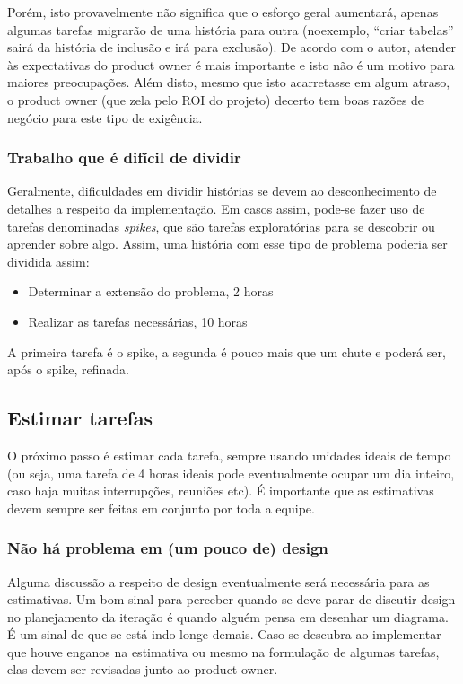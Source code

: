 \documentclass[a4paper,abntfigtabnum,noindentfirst]{abnt}
\begin{document}
Porém, isto provavelmente não significa que o esforço geral aumentará, apenas algumas tarefas migrarão de uma história para outra (noexemplo, ``criar tabelas'' sairá da história de inclusão e irá para exclusão). De acordo com o autor, atender às expectativas do product owner é mais importante e isto não é um motivo para maiores preocupações. Além disto, mesmo que isto acarretasse em algum atraso, o product owner (que zela pelo ROI do projeto) decerto tem boas razões de negócio para este tipo de exigência.


\subsubsection{Trabalho que é difícil de dividir}

Geralmente, dificuldades em dividir histórias se devem ao desconhecimento de detalhes a respeito da implementação. Em casos assim, pode-se fazer uso de tarefas denominadas \textit{spikes}, que são tarefas exploratórias para se descobrir ou aprender sobre algo. Assim, uma história com esse tipo de problema poderia ser dividida assim:
\begin{itemize}
 \item Determinar a extensão do problema, 2 horas
 \item Realizar as tarefas necessárias, 10 horas
\end{itemize}

A primeira tarefa é o spike, a segunda é pouco mais que um chute e poderá ser, após o spike, refinada.


\subsection{Estimar tarefas}

O próximo passo é estimar cada tarefa, sempre usando unidades ideais de tempo (ou seja, uma tarefa de 4 horas ideais pode eventualmente ocupar um dia inteiro, caso haja muitas interrupções, reuniões etc). É importante que as estimativas devem sempre ser feitas em conjunto por toda a equipe.

\subsubsection{Não há problema em (um pouco de) design}

Alguma discussão a respeito de design eventualmente será necessária para as estimativas. Um bom sinal para perceber quando se deve parar de discutir design no planejamento da iteração é quando alguém pensa em desenhar um diagrama. É um sinal de que se está indo longe demais. Caso se descubra ao implementar que houve enganos na estimativa ou mesmo na formulação de algumas tarefas, elas devem ser revisadas junto ao product owner.
\end{document}
